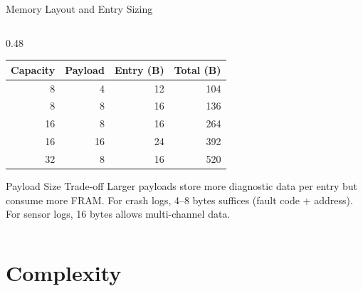 \documentclass[aspectratio=169, 10pt]{beamer}
\begin{document}
\begin{frame}{Memory Layout and Entry Sizing}
\begin{columns}[T]
\begin{column}{0.48\textwidth}
\begin{table}
\centering
\scriptsize
\begin{tabular}{@{}rrrr@{}}
\toprule
\textbf{Capacity} & \textbf{Payload} & \textbf{Entry (B)} & \textbf{Total (B)} \\
\midrule
8   & 4  & 12 & 104 \\
8   & 8  & 16 & 136 \\
16  & 8  & 16 & 264 \\
16  & 16 & 24 & 392 \\
32  & 8  & 16 & 520 \\
\bottomrule
\end{tabular}
\end{table}

\vspace{0.3em}
\begin{alertblock}{Payload Size Trade-off}
Larger payloads store more diagnostic data per entry but
consume more FRAM. For crash logs, 4--8 bytes suffices
(fault code + address). For sensor logs, 16 bytes allows
multi-channel data.
\end{alertblock}
\end{column}
\end{columns}
\end{frame}

\section{Complexity}
\end{document}
